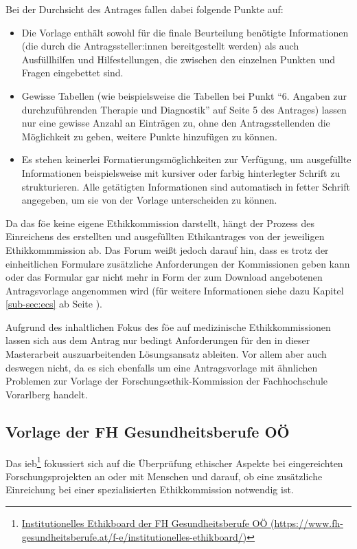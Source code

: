\documentclass[a4paper,12pt,twoside]{scrreprt}
\begin{document}
Bei der Durchsicht des Antrages fallen dabei folgende Punkte auf:
\begin{itemize}
    \item Die Vorlage enthält sowohl für die finale Beurteilung benötigte Informationen (die durch die Antragssteller:innen bereitgestellt werden) als auch Ausfüllhilfen und Hilfestellungen, die zwischen den einzelnen Punkten und Fragen eingebettet sind.
    \item Gewisse Tabellen (wie beispielsweise die Tabellen bei Punkt \enquote{6. Angaben zur durchzuführenden Therapie und Diagnostik} auf Seite 5 des Antrages) lassen nur eine gewisse Anzahl an Einträgen zu, ohne den Antragsstellenden die Möglichkeit zu geben, weitere Punkte hinzufügen zu können.
    \item Es stehen keinerlei Formatierungsmöglichkeiten zur Verfügung, um ausgefüllte Informationen beispielsweise mit kursiver oder farbig hinterlegter Schrift zu strukturieren. Alle getätigten Informationen sind automatisch in fetter Schrift angegeben, um sie von der Vorlage unterscheiden zu können.
\end{itemize}

Da das \ac{föe} keine eigene Ethikkommission darstellt, hängt der Prozess des Einreichens des erstellten und ausgefüllten Ethikantrages von der jeweiligen Ethikkommmission ab. Das Forum weißt jedoch darauf hin, dass es trotz der einheitlichen Formulare zusätzliche Anforderungen der Kommissionen geben kann oder das Formular gar nicht mehr in Form der zum Download angebotenen Antragsvorlage angenommen wird (für weitere Informationen siehe dazu Kapitel \ref{sub-sec:ecs} ab Seite \pageref{sub-sec:ecs}). \cite{ethikkommission_der_medizinischen_universitat_graz_download_2012}

Aufgrund des inhaltlichen Fokus des \acl{föe} auf medizinische Ethikkommissionen lassen sich aus dem Antrag nur bedingt Anforderungen für den in dieser Masterarbeit auszuarbeitenden Lösungsansatz ableiten. Vor allem aber auch deswegen nicht, da es sich ebenfalls um eine Antragsvorlage mit ähnlichen Problemen zur Vorlage der Forschungsethik-Kommission der Fachhochschule Vorarlberg handelt.

\subsection{Vorlage der FH Gesundheitsberufe OÖ}
\label{sub-cec:vorlage-fh-oö}

Das \ac{ieb}\footnote{\href{https://www.fh-gesundheitsberufe.at/f-e/institutionelles-ethikboard/}{Institutionelles Ethikboard der FH Gesundheitsberufe OÖ (\url{https://www.fh-gesundheitsberufe.at/f-e/institutionelles-ethikboard/})}} fokussiert sich auf die Überprüfung ethischer Aspekte bei eingereichten Forschungsprojekten an oder mit Menschen und darauf, ob eine zusätzliche Einreichung bei einer spezialisierten Ethikkommission notwendig ist. \cite{fh_gesundheitsberufe_oo_gmbh_institutionelles_2023}
\end{document}
